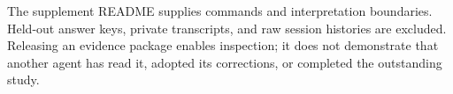 The supplement README supplies commands and interpretation boundaries. Held-out answer keys, private transcripts, and raw session histories are excluded. Releasing an evidence package enables inspection; it does not demonstrate that another agent has read it, adopted its corrections, or completed the outstanding study.



